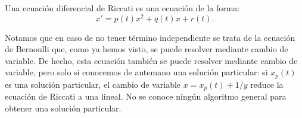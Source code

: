 \documentclass[../ecuaciones_diferenciales.tex]{subfiles}
\begin{document}
\begin{definition}
	Una ecuación diferencial de Riccati es una ecuación de la forma:
	\[x' = p(t)x^2 + q(t)x + r(t).\]
\end{definition}

Notamos que en caso de no tener término
independiente se trata de la ecuación de Bernoulli que, como ya hemos visto, se
puede resolver mediante cambio de variable. De hecho, esta ecuación también se
puede resolver mediante cambio de variable, pero solo si conocemos de antemano
una solución particular: si \(x_p(t)\) es una solución particular, el cambio de
variable \(x = x_p(t) + 1/y\) reduce la ecuación de Riccati a una lineal. No
se conoce ningún algoritmo general para obtener una solución particular.
\end{document}
